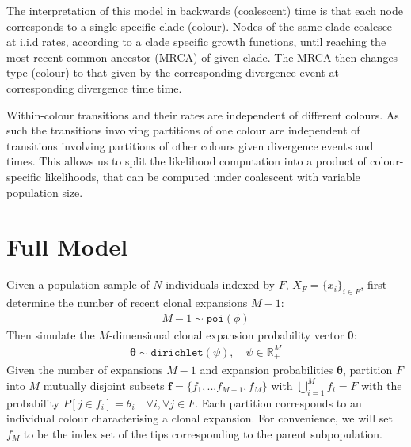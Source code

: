 \documentclass{report}
\newcommand{\R}{\mathbb{R}}
\theoremstyle{definition}
\begin{document}
The interpretation of this model in backwards (coalescent) time is that each node corresponds to a single specific clade (colour). Nodes of the same clade coalesce at i.i.d rates, according to a clade specific growth functions, until reaching the most recent common ancestor (MRCA) of given clade. The MRCA then changes type (colour) to that given by the corresponding divergence event at corresponding divergence time time. 

Within-colour transitions and their rates are independent of different colours. As such the transitions involving partitions of one colour  are independent of transitions involving partitions of other colours given divergence events and times. This allows us to split the likelihood computation into a product of colour-specific likelihoods, that can be computed under coalescent with variable population size.\\

\section{Full Model}
Given a population sample of $N$ individuals indexed by $F$, $X_F = \{x_i\}_{i \in F}$, first determine the number of recent clonal expansions $M-1$:
\begin{gather}
M-1 \sim \texttt{poi}(\phi)
\end{gather}
Then simulate the $M$-dimensional clonal expansion probability vector $\pmb{\theta}$:
\begin{gather}
\pmb{\theta} \sim \texttt{dirichlet}(\psi), \quad \psi \in \R_+^{M} 
\end{gather}
Given the number of expansions $M-1$ and expansion probabilities $\pmb{\theta}$, partition $F$ into $M$ mutually disjoint subsets $\mathbf{f}=\{f_1, ... f_{M-1}, f_{M}\}$ with $\bigcup\limits_{i=1}^{M} f_{i} = F$ with the probability $P[j\in f_{i}]=\theta_i\quad \forall i,\forall j \in F$.  
Each partition corresponds to an individual colour characterising a clonal expansion. For convenience, we will set $f_{M}$ to be the index set of the tips corresponding to the parent subpopulation.
\end{document}
